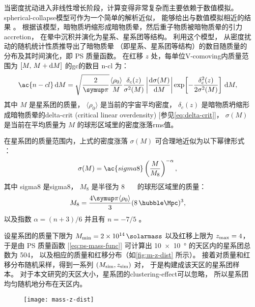 当密度扰动进入非线性增长阶段，计算变得非常复杂而主要依赖于数值模拟。
\ac{spherical-collapse}模型可作为一个简单的解析近似，
能够给出与数值模拟相近的结果 \cite{gunn1972}。
根据该模型，暗物质坍缩形成暗物质晕，然后重子物质被暗物质晕的引力\ac{accretion}，
在晕中沉积并演化为星系、星系团等结构。
利用这个模型， 从密度扰动的随机统计性质推导出了暗物质晕
（即星系、星系团等结构）的数目随质量的分布及其时间演化，即 \ac{PS} 质量函数。
在红移 $z$ 处，每单位\ac{V-comoving}内质量范围为 $[M,\, M+\mathrm{d}M]$
的\ac{gc}的数目 \ac{n-cl} 为：
\begin{equation}
  \label{eq:ps-mass-func}
  \ac{n-cl} \,\D{M} =
    \sqrt{\frac{2}{\Cpi}} \frac{\langle \rho_0 \rangle}{M}
    \frac{\delta_c(z)}{\sigma^2(M)} \left| \diff{\sigma(M)}{M} \right|
    \exp\!\left[ -\frac{\delta_c^2(z)}{2\sigma^2(M)} \right] \,\D{M} ,
\end{equation}
其中
$M$ 是星系团的质量，
$\langle \rho_0 \rangle$ 是当前的宇宙平均密度，
$\delta_c(z)$ 是暗物质坍缩形成暗物质晕的\acl{delta-crit}
(critical linear overdensity) [参见\autoref{eq:delta-crit}]，
$\sigma(M)$ 是当前在平均质量为 $M$ 的球形区域里的密度涨落\ac{rms}值。

在星系团的质量范围内，上式的密度涨落 $\sigma(M)$ 可合理地近似为以下幂律形式
\cite{sarazin2002,randall2002}：
\begin{equation}
  \label{eq:sigma-mass}
  \sigma(M) = \ac{sigma8} \left( \frac{M}{M_8} \right)^{-\alpha} ,
\end{equation}
其中
\ac{sigma8} 是\acl{sigma8}，
$M_8$ 是半径为 \SI{8}{\per\hubble\Mpc} 的球形区域里的质量：
\begin{equation}
  M_8 = \frac{4\Cpi \langle \rho_0 \rangle}{3}
    (\SI{8}{\per\hubble\Mpc})^3 ,
\end{equation}
以及指数 $\alpha = (n+3)/6$ 并且有 $n = -7/5$ \cite{bahcall1998}。

设星系团的质量下限为 $M_{\R{min}} = \SI{2e14}{\solarmass}$
以及红移上限为 $z_{\mathrm{max}} = 4$，
于是由 \ac{PS} 质量函数 [\autoref{eq:ps-mass-func}]
可计算出 \SI{10 x 10}{\degree} 的天区内的星系团总数为 504，
以及相应的质量和红移分布（如\autoref{fig:m-z-dist} 所示）。
接着对质量和红移分布随机采样，得到一系列 $(M_{\mathrm{sim}}, z_{\mathrm{sim}})$ 对，
于是构建成该天区的星系团样本。
对于本文研究的天区大小，星系团的\ac{clustering-effect}可以忽略，
所以星系团均匀随机地分布在天区内。

\begin{figure}[htp]
  \centering
  \texttt{[image: mass-z-dist]}
  \label{fig:m-z-dist}
\end{figure}

